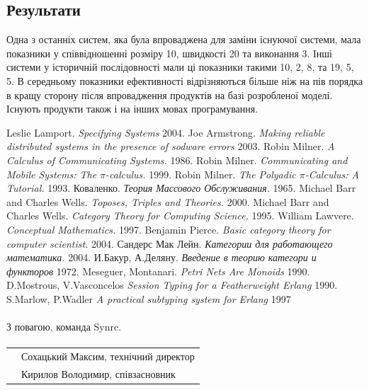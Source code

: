 \documentclass[11pt,oneside]{article}
\begin{document}
\subsection{Результати}
\vspace{0.5cm}
   Одна з останніх систем, яка була впроваджена для заміни існуючої системи, мала
   показники у співвідношенні розміру 10, швидкості 20 та виконання 3. Інші системи
   у історичній послідовності мали ці показники такими 10, 2, 8, та 19, 5, 5.
   В середньому показники ефективності відрізняються більше ніж на пів порядка
   в кращу сторону після впровадження продуктів на базі розробленої моделі.
   Існують продукти також і на інших мовах програмування.

\newpage
\begin{thebibliography}{9}

      Leslie Lamport. \textit{Specifying Systems} 2004.
      Joe Armstrong. \textit{Making reliable distributed systems in the presence of sodware errors} 2003.
     Robin Milner. \textit{ A Calculus of Communicating Systems.} 1986.
   Robin Milner. \textit{Communicating and Mobile Systems: The $\pi$-calculus.} 1999.
   Robin Milner. \textit{The Polyadic $\pi$-Calculus: A Tutorial.} 1993.
     Коваленко. \textit{Теория Массового Обслуживания.} 1965.
    Michael Barr and Charles Wells. \textit{Toposes, Triples and Theories.} 2000.
    Michael Barr and Charles Wells. \textit{Category Theory for Computing Science.} 1995.
 William Lawvere. \textit{Conceptual Mathematics.} 1997.
   Benjamin Pierce. \textit{Basic category theory for computer scientist.} 2004.
   Сандерс Мак Лейн. \textit{Категории для работающего математика.} 2004.
    И.Бакур, А.Деляну. \textit{Введение в теорию категори и функторов} 1972.
 Meseguer, Montanari.  \textit{Petri Nets Are Monoids} 1990.
\bibitem{}         D.Mostrous, V.Vasconcelos \textit{Session Typing for a Featherweight Erlang} 1990.
\bibitem{}         S.Marlow, P.Wadler \textit{A practical subtyping system for Erlang} 1997
\end{thebibliography}

\vspace{3\baselineskip}
\paragraph{}
З повагою, команда Synrc.
\paragraph{}
\vspace{3\baselineskip}
\begin{tabular}{ll}
        & Сохацький Максим, технічний директор \\
        & Кирилов Володимир, співзасновник
\end{tabular}
\end{document}
